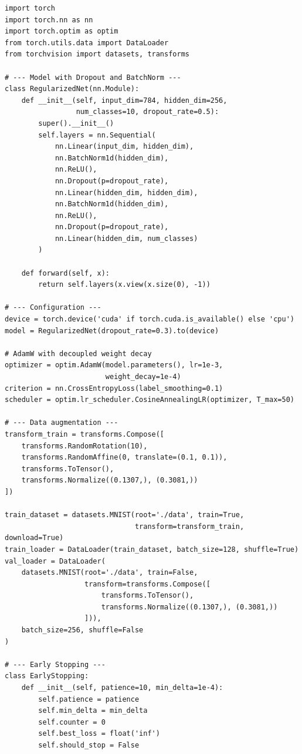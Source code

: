 \begin{codeblock}[title=\textbf{Complete regularized training loop}]
\begin{verbatim}
import torch
import torch.nn as nn
import torch.optim as optim
from torch.utils.data import DataLoader
from torchvision import datasets, transforms

# --- Model with Dropout and BatchNorm ---
class RegularizedNet(nn.Module):
    def __init__(self, input_dim=784, hidden_dim=256,
                 num_classes=10, dropout_rate=0.5):
        super().__init__()
        self.layers = nn.Sequential(
            nn.Linear(input_dim, hidden_dim),
            nn.BatchNorm1d(hidden_dim),
            nn.ReLU(),
            nn.Dropout(p=dropout_rate),
            nn.Linear(hidden_dim, hidden_dim),
            nn.BatchNorm1d(hidden_dim),
            nn.ReLU(),
            nn.Dropout(p=dropout_rate),
            nn.Linear(hidden_dim, num_classes)
        )

    def forward(self, x):
        return self.layers(x.view(x.size(0), -1))

# --- Configuration ---
device = torch.device('cuda' if torch.cuda.is_available() else 'cpu')
model = RegularizedNet(dropout_rate=0.3).to(device)

# AdamW with decoupled weight decay
optimizer = optim.AdamW(model.parameters(), lr=1e-3,
                        weight_decay=1e-4)
criterion = nn.CrossEntropyLoss(label_smoothing=0.1)
scheduler = optim.lr_scheduler.CosineAnnealingLR(optimizer, T_max=50)

# --- Data augmentation ---
transform_train = transforms.Compose([
    transforms.RandomRotation(10),
    transforms.RandomAffine(0, translate=(0.1, 0.1)),
    transforms.ToTensor(),
    transforms.Normalize((0.1307,), (0.3081,))
])

train_dataset = datasets.MNIST(root='./data', train=True,
                               transform=transform_train, download=True)
train_loader = DataLoader(train_dataset, batch_size=128, shuffle=True)
val_loader = DataLoader(
    datasets.MNIST(root='./data', train=False,
                   transform=transforms.Compose([
                       transforms.ToTensor(),
                       transforms.Normalize((0.1307,), (0.3081,))
                   ])),
    batch_size=256, shuffle=False
)

# --- Early Stopping ---
class EarlyStopping:
    def __init__(self, patience=10, min_delta=1e-4):
        self.patience = patience
        self.min_delta = min_delta
        self.counter = 0
        self.best_loss = float('inf')
        self.should_stop = False


\end{verbatim}
\end{codeblock}
